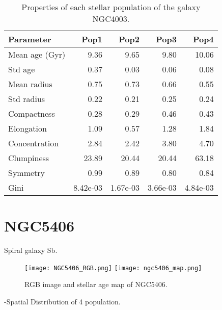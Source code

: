 \begin{table}[h]
\centering
\begin{tabular}{l|r|r|r|r}
Parameter & Pop1 & Pop2 & Pop3 & Pop4 \\\hline
Mean age (Gyr) & 9.36 & 9.65 & 9.80 & 10.06 \\
Std age & 0.37 & 0.03 & 0.06 & 0.08 \\
Mean radius & 0.75 & 0.73 & 0.66 & 0.55 \\
Std radius & 0.22 & 0.21 & 0.25 & 0.24 \\
Compactness & 0.28 & 0.29 & 0.46 & 0.43 \\
Elongation & 1.09 & 0.57 & 1.28 & 1.84 \\
Concentration & 2.84  & 2.42 & 3.80 & 4.70 \\
Clumpiness & 23.89  & 20.44 & 20.44 & 63.18 \\
Symmetry & 0.99  & 0.89 & 0.80 & 0.84 \\
Gini & 8.42e-03 & 1.67e-03 & 3.66e-03 & 4.84e-03 \\
\end{tabular}
\caption{\label{tab:widgets}Properties of each stellar population of the galaxy NGC4003.}
\end{table}

\newpage
\section*{NGC5406}
Spiral galaxy Sb.

\begin{figure}[bh]
\begin{center}
\texttt{[image: NGC5406\_RGB.png]}
\texttt{[image: ngc5406\_map.png]}
 \caption{RGB image and stellar age map of NGC5406.}
   \label{fig1}
\end{center}
\end{figure}

-Spatial Distribution of 4 population.

